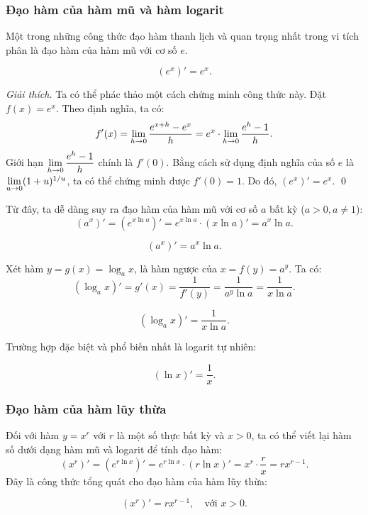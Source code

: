 \subsubsection*{Đạo hàm của hàm mũ và hàm logarit}

Một trong những công thức đạo hàm thanh lịch và quan trọng nhất trong vi tích phân là đạo hàm của hàm mũ với cơ số $e$.
\begin{importantbox}
\[ (e^x)' = e^x. \]
\end{importantbox}
\textit{Giải thích.} Ta có thể phác thảo một cách chứng minh công thức này. Đặt $f(x) = e^x$. Theo định nghĩa, ta có:
\[ f'(x) = \lim\limits_{h \to 0} \dfrac{e^{x+h}-e^x}{h} = e^x \cdot \lim\limits_{h \to 0}\dfrac{e^h-1}{h}. \]
Giới hạn $\lim\limits_{h \to 0}\dfrac{e^h-1}{h}$ chính là $f'(0)$. Bằng cách sử dụng định nghĩa của số $e$ là $\lim\limits_{u \to 0} (1+u)^{1/u}$, ta có thể chứng minh được $f'(0) = 1$. Do đó, $(e^x)' = e^x$. \qed

Từ đây, ta dễ dàng suy ra đạo hàm của hàm mũ với cơ số $a$ bất kỳ ($a > 0, a \ne 1$):
\[ (a^x)' = (e^{x \ln a})' = e^{x \ln a} \cdot (x \ln a)' = a^x \ln a. \]
\begin{importantbox}
\[ (a^x)' = a^x \ln a. \]
\end{importantbox}

\begin{example}
    Xét hàm $y = g(x) = \log_a x$, là hàm ngược của $x = f(y) = a^y$. Ta có:
    \[ (\log_a x)' = g'(x) = \dfrac{1}{f'(y)} = \dfrac{1}{a^y \ln a} = \dfrac{1}{x \ln a}. \]
    \begin{importantbox}
    \[ (\log_a x)' = \dfrac{1}{x \ln a}. \]
    \end{importantbox}
    Trường hợp đặc biệt và phổ biến nhất là logarit tự nhiên:
    \begin{importantbox}
    \[ (\ln x)' = \dfrac{1}{x}. \]
    \end{importantbox}
\end{example}


\subsubsection*{Đạo hàm của hàm lũy thừa}

Đối với hàm $y=x^r$ với $r$ là một số thực bất kỳ và $x > 0$, ta có thể viết lại hàm số dưới dạng hàm mũ và logarit để tính đạo hàm:
\[ (x^r)' = (e^{r \ln x})' = e^{r \ln x} \cdot (r \ln x)' = x^r \cdot \dfrac{r}{x} = rx^{r-1}. \]
Đây là công thức tổng quát cho đạo hàm của hàm lũy thừa:
\begin{importantbox}
\[ (x^r)' = rx^{r-1}, \quad \text{với } x > 0. \]
\end{importantbox}

